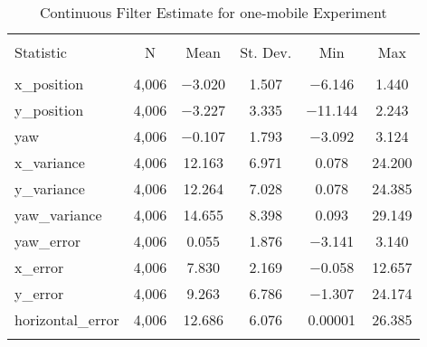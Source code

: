 
\begin{table}[h] \centering 
  \caption{Continuous Filter Estimate for one-mobile Experiment} 
  \label{tab:one_mobile_continuous_summary} 
\begin{tabular}{@{\extracolsep{5pt}}lccccc} 
\\[-1.8ex]\hline 
\hline \\[-1.8ex] 
Statistic & \multicolumn{1}{c}{N} & \multicolumn{1}{c}{Mean} & \multicolumn{1}{c}{St. Dev.} & \multicolumn{1}{c}{Min} & \multicolumn{1}{c}{Max} \\ 
\hline \\[-1.8ex] 
x\_position & 4,006 & $-$3.020 & 1.507 & $-$6.146 & 1.440 \\ 
y\_position & 4,006 & $-$3.227 & 3.335 & $-$11.144 & 2.243 \\ 
yaw & 4,006 & $-$0.107 & 1.793 & $-$3.092 & 3.124 \\ 
x\_variance & 4,006 & 12.163 & 6.971 & 0.078 & 24.200 \\ 
y\_variance & 4,006 & 12.264 & 7.028 & 0.078 & 24.385 \\ 
yaw\_variance & 4,006 & 14.655 & 8.398 & 0.093 & 29.149 \\ 
yaw\_error & 4,006 & 0.055 & 1.876 & $-$3.141 & 3.140 \\ 
x\_error & 4,006 & 7.830 & 2.169 & $-$0.058 & 12.657 \\ 
y\_error & 4,006 & 9.263 & 6.786 & $-$1.307 & 24.174 \\ 
horizontal\_error & 4,006 & 12.686 & 6.076 & 0.00001 & 26.385 \\ 
\hline \\[-1.8ex] 
\end{tabular} 
\end{table} 

